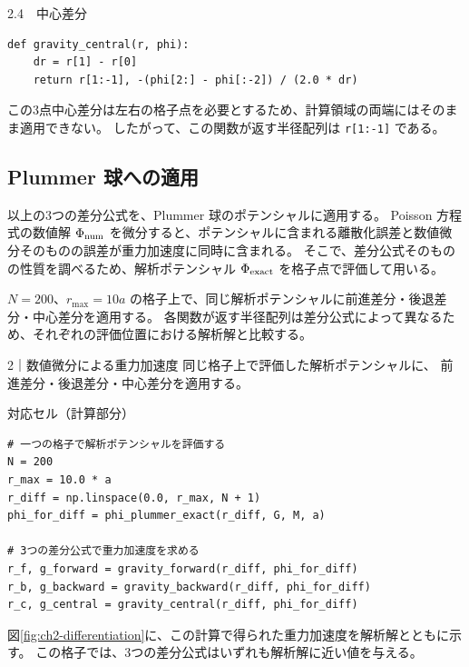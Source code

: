 \begin{listingbox}{2.4　中心差分}
\begin{Verbatim}[fontsize=\small]
def gravity_central(r, phi):
    dr = r[1] - r[0]
    return r[1:-1], -(phi[2:] - phi[:-2]) / (2.0 * dr)
\end{Verbatim}
\end{listingbox}

この3点中心差分は左右の格子点を必要とするため、計算領域の両端にはそのまま適用できない。
したがって、この関数が返す半径配列は \texttt{r[1:-1]} である。

\subsection{Plummer 球への適用}

以上の3つの差分公式を、Plummer 球のポテンシャルに適用する。
Poisson 方程式の数値解 $\Phi_{\rm num}$ を微分すると、ポテンシャルに含まれる離散化誤差と数値微分そのものの誤差が重力加速度に同時に含まれる。
そこで、差分公式そのものの性質を調べるため、解析ポテンシャル $\Phi_{\rm exact}$ を格子点で評価して用いる。

$N=200$、$r_{\max}=10a$ の格子上で、同じ解析ポテンシャルに前進差分・後退差分・中心差分を適用する。
各関数が返す半径配列は差分公式によって異なるため、それぞれの評価位置における解析解と比較する。

\begin{notebookblock}{2｜数値微分による重力加速度}
同じ格子上で評価した解析ポテンシャルに、
前進差分・後退差分・中心差分を適用する。

{\sffamily\small\color{graytext}対応セル（計算部分）}
\begin{Verbatim}[xleftmargin=2mm,fontsize=\small,frame=single,framesep=1.8mm,framerule=0.35pt,rulecolor=\color{listingframe},fillcolor=\color{listingbg}]
# 一つの格子で解析ポテンシャルを評価する
N = 200
r_max = 10.0 * a
r_diff = np.linspace(0.0, r_max, N + 1)
phi_for_diff = phi_plummer_exact(r_diff, G, M, a)

# 3つの差分公式で重力加速度を求める
r_f, g_forward = gravity_forward(r_diff, phi_for_diff)
r_b, g_backward = gravity_backward(r_diff, phi_for_diff)
r_c, g_central = gravity_central(r_diff, phi_for_diff)
\end{Verbatim}
\end{notebookblock}

図\ref{fig:ch2-differentiation}に、この計算で得られた重力加速度を解析解とともに示す。
この格子では、3つの差分公式はいずれも解析解に近い値を与える。

